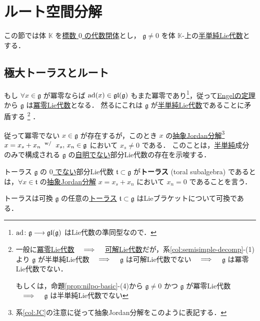 \documentclass[rep_main]{subfiles}
\begin{document}
\section{ルート空間分解}

この節では体 $\mathbb{K}$ を\underline{標数 $0$ の代数閉体}とし，
$\mathfrak{g} \neq 0$ を体 $\mathbb{K}$-上の\hyperref[def:semisimple-LieAlg]{半単純Lie代数}とする．

\subsection{極大トーラスとルート}

もし $\forall x \in \mathfrak{g}$ が冪零ならば $\operatorname{ad}(x) \in \mathfrak{gl} (\mathfrak{g})$ もまた冪零であり\footnote{$\operatorname{ad} \colon \mathfrak{g} \longrightarrow \mathfrak{gl}(\mathfrak{g})$ はLie代数の準同型なので．}，従って\hyperref[thm:Engel]{Engelの定理}から $\mathfrak{g}$ は\hyperref[def:nilpotent-LieAlg]{冪零Lie代数}となる．
然るにこれは $\mathfrak{g}$ が\hyperref[def:semisimple-LieAlg]{半単純Lie代数}であることに矛盾する
\footnote{
	一般に\hyperref[def:nilpotent-LieAlg]{冪零Lie代数} $\quad \Longrightarrow \quad$ \hyperref[def:solvable-LieAlg]{可解Lie代数}だが，系\ref{col:semisimple-decomp}-(1) より $\mathfrak{g}$ が半単純Lie代数 $\quad \Longrightarrow \quad$ $\mathfrak{g}$ は可解Lie代数でない $\quad \Longrightarrow \quad$ $\mathfrak{g}$ は冪零Lie代数でない．
	
	もしくは，命題\ref{prop:nilpo-basic}-(4)から $\mathfrak{g} \neq 0$ かつ $\mathfrak{g}$ が冪零Lie代数 $\quad \Longrightarrow \quad$ $\mathfrak{g}$ は半単純Lie代数でない
}
．

従って冪零でない $x \in \mathfrak{g}$ が存在するが，このとき $x$ の\hyperref[def:abstruct-JC]{抽象Jordan分解}\footnote{系\ref{col:JC}の注意に従って抽象Jordan分解をこのように表記する．} $x = x_s + x_n\mathrel{} {}^{\mathrm{w}/} \mathrel{} x_s,\, x_n \in \mathfrak{g}$ において $x_s \neq 0$ である．
このことは，\hyperref[def:semisimple-end]{半単純}成分のみで構成される $\mathfrak{g}$ の\underline{自明でない}部分Lie代数の存在を示唆する．

\begin{mydef}[label=def:toral-subLieAlg]{トーラス}
	$\mathfrak{g}$ の \underline{$0$ でない}部分Lie代数 $\mathfrak{t} \subset \mathfrak{g}$ が\textbf{トーラス} (toral subalgebra) であるとは，$\forall x \in \mathfrak{t}$ の\hyperref[def:abstruct-JC]{抽象Jordan分解} $x = x_s + x_n$ において $x_n = 0$ であることを言う．
\end{mydef}

\begin{mylem}[label=lem:torus]{トーラスは可換}
	$\mathfrak{g}$ の任意の\hyperref[def:toral-subLieAlg]{トーラス} $\mathfrak{t} \subset \mathfrak{g}$ はLieブラケットについて可換である．
\end{mylem}
\end{document}
